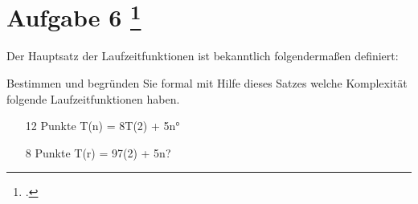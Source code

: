 \documentclass{lehramt-informatik-aufgabe}
\begin{document}
\section{Aufgabe 6
\footcite{66115:2019:09}}

Der Hauptsatz der Laufzeitfunktionen ist bekanntlich folgendermaßen definiert:

Bestimmen und begründen Sie formal mit Hilfe dieses Satzes welche Komplexität folgende Laufzeitfunktionen haben.

\begin{enumerate}

\item [12 Punkte] T(n) = 8T(2) + 5n°

\item [8 Punkte] T(r) = 97(2) + 5n?

\end{enumerate}
\end{document}
